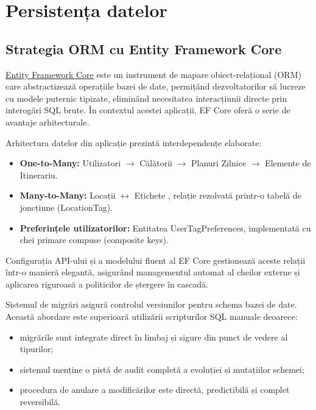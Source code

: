 \section{Persistența datelor}

\subsection{Strategia ORM cu Entity Framework Core}
\href{https://learn.microsoft.com/en-us/ef/core/}{Entity Framework Core}\cite{EF_core_ref} este un instrument de mapare obiect-relațional (ORM) care abstractizează operațiile bazei de date, permițând dezvoltatorilor să lucreze cu modele puternic tipizate, eliminând necesitatea interacțiunii directe prin interogări SQL brute. În contextul acestei aplicații, EF Core oferă o serie de avantaje arhitecturale.

Arhitectura datelor din aplicație prezintă interdependențe elaborate:

\begin{itemize}
    \item  \textbf{One-to-Many:} Utilizatori $\to$ Călătorii $\to$ Planuri Zilnice $\to$ Elemente de Itinerariu.
    \item  \textbf{Many-to-Many:} Locații $\leftrightarrow$ Etichete , relație rezolvată printr-o tabelă de joncțiune (LocationTag).
    \item  \textbf{Preferințele utilizatorilor:} Entitatea UserTagPreferences, implementată cu chei primare compuse (composite keys).
\end{itemize}

Configurația API-ului și a modelului fluent al EF Core gestionează aceste relații într-o manieră elegantă, asigurând managementul automat al cheilor externe și aplicarea riguroasă a politicilor de ștergere în cascadă.

Sistemul de migrări asigură controlul versiunilor pentru schema bazei de date. Această abordare este superioară utilizării scripturilor SQL manuale deoarece:

\begin{itemize}
    \item  migrările sunt integrate direct în limbaj și sigure din punct de vedere al tipurilor;
    \item  sistemul menține o pistă de audit completă a evoluției și mutațiilor schemei;
    \item  procedura de anulare a modificărilor este directă, predictibilă și complet reversibilă.
\end{itemize}


